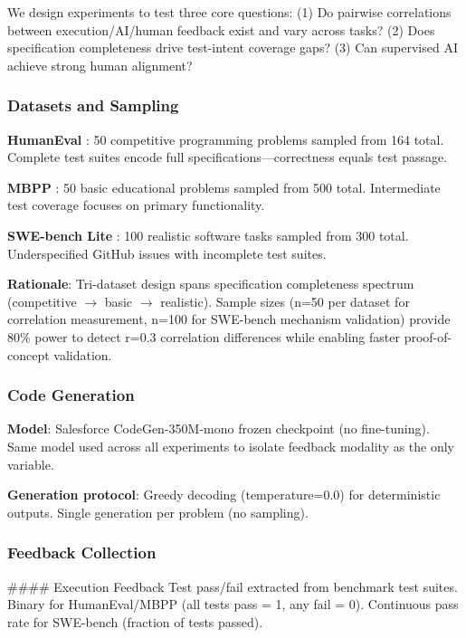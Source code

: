 
We design experiments to test three core questions: (1) Do pairwise correlations between execution/AI/human feedback exist and vary across tasks? (2) Does specification completeness drive test-intent coverage gaps? (3) Can supervised AI achieve strong human alignment?

\subsubsection{Datasets and Sampling}

\textbf{HumanEval} \citep{chen2021evaluating}: 50 competitive programming problems sampled from 164 total. Complete test suites encode full specifications---correctness equals test passage.

\textbf{MBPP} \citep{austin2021program}: 50 basic educational problems sampled from 500 total. Intermediate test coverage focuses on primary functionality.

\textbf{SWE-bench Lite} \citep{jimenez2023swebench}: 100 realistic software tasks sampled from 300 total. Underspecified GitHub issues with incomplete test suites.

\textbf{Rationale}: Tri-dataset design spans specification completeness spectrum (competitive $\rightarrow$ basic $\rightarrow$ realistic). Sample sizes (n=50 per dataset for correlation measurement, n=100 for SWE-bench mechanism validation) provide 80\% power to detect r=0.3 correlation differences while enabling faster proof-of-concept validation.

\subsubsection{Code Generation}

\textbf{Model}: Salesforce CodeGen-350M-mono frozen checkpoint (no fine-tuning). Same model used across all experiments to isolate feedback modality as the only variable.

\textbf{Generation protocol}: Greedy decoding (temperature=0.0) for deterministic outputs. Single generation per problem (no sampling).

\subsubsection{Feedback Collection}

\#\#\#\# Execution Feedback
Test pass/fail extracted from benchmark test suites. Binary for HumanEval/MBPP (all tests pass = 1, any fail = 0). Continuous pass rate for SWE-bench (fraction of tests passed).

